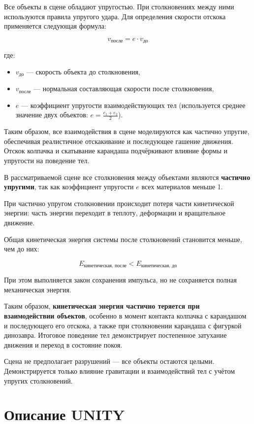 \documentclass[a4paper,12pt]{article}
\begin{document}
Все объекты в сцене обладают упругостью. При столкновениях между ними используются правила упругого удара. Для определения скорости отскока применяется следующая формула:

\[
v_{\text{после}} = e \cdot v_{\text{до}}
\]

где:
\begin{itemize}
    \item $v_{\text{до}}$ — скорость объекта до столкновения,
    \item $v_{\text{после}}$ — нормальная составляющая скорости после столкновения,
    \item $e$ — коэффициент упругости взаимодействующих тел (используется среднее значение двух объектов: $e = \frac{e_1 + e_2}{2}$).
\end{itemize}

Таким образом, все взаимодействия в сцене моделируются как частично упругие, обеспечивая реалистичное отскакивание и последующее гашение движения. Отскок колпачка и скатывание карандаша подчёркивают влияние формы и упругости на поведение тел.

В рассматриваемой сцене все столкновения между объектами являются \textbf{частично упругими}, так как коэффициент упругости $e$ всех материалов меньше 1.

При частично упругом столкновении происходит потеря части кинетической энергии: часть энергии переходит в теплоту, деформации и вращательное движение.

Общая кинетическая энергия системы после столкновений становится меньше, чем до них:

\[
E_{\text{кинетическая, после}} < E_{\text{кинетическая, до}}
\]

При этом выполняется закон сохранения импульса, но не сохраняется полная механическая энергия.

Таким образом, \textbf{кинетическая энергия частично теряется при взаимодействии объектов}, особенно в момент контакта колпачка с карандашом и последующего его отскока, а также при столкновении карандаша с фигуркой динозавра. Итоговое поведение тел демонстрирует постепенное затухание движения и переход в состояние покоя.

Сцена не предполагает разрушений — все объекты остаются целыми. Демонстрируется только влияние гравитации и взаимодействий тел с учётом упругих столкновений.

	
	\newpage
	\section{Описание UNITY}
	
\end{document}
